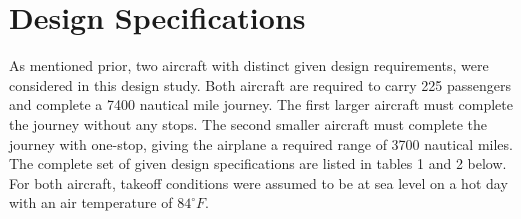 \documentclass{article}
\begin{document}
    \section{Design Specifications}
    \label{sec:specs}
    \begin{flushleft}
        As mentioned prior, two aircraft with distinct given design
        requirements, were considered in this design study. Both aircraft are
        required to carry 225 passengers and complete a 7400 nautical mile
        journey. The first larger aircraft must complete the journey without any
        stops. The second smaller aircraft must complete the journey with
        one-stop, giving the airplane a required range of 3700 nautical miles.
        The complete set of given design specifications are listed in tables 1
        and 2 below. For both aircraft, takeoff conditions were assumed to be at
        sea level on a hot day with an air temperature of $84^{\circ}F$.
    \end{flushleft}
\end{document}
